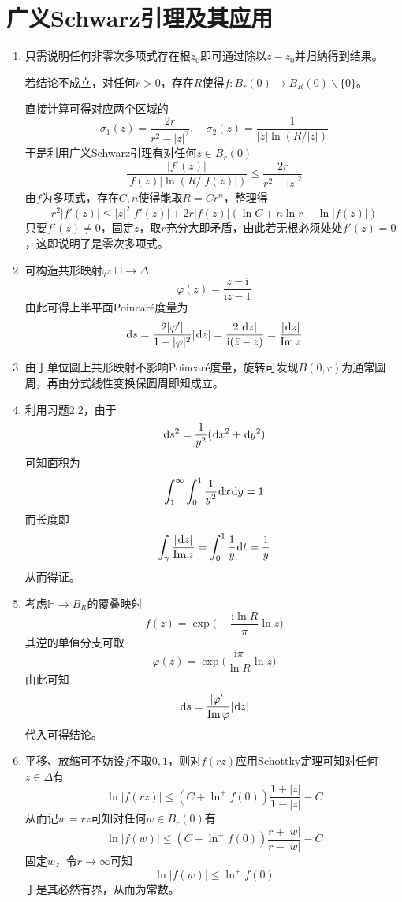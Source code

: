 \documentclass[a4paper,UTF8,fontset=windows,10pt]{ctexart}
\newcommand*{\ir}{\mathrm{i}}
\newcommand*{\dr}{\hspace{0.07em}\mathrm{d}}
\newcommand*{\im}{\mathrm{Im}\,}
\begin{document}
\section{广义Schwarz引理及其应用}
\begin{enumerate}
    \item 只需说明任何非零次多项式存在根$z_0$即可通过除以$z-z_0$并归纳得到结果。
    
    若结论不成立，对任何$r>0$，存在$R$使得$f:B_r(0)\to B_R(0)\backslash\{0\}$。

    直接计算可得对应两个区域的
    $$\sigma_1(z)=\frac{2r}{r^2-|z|^2},\quad\sigma_2(z)=\frac{1}{|z|\ln(R/|z|)}$$
    于是利用广义Schwarz引理有对任何$z\in B_r(0)$
    $$\frac{|f'(z)|}{|f(z)|\ln(R/|f(z)|)}\le\frac{2r}{r^2-|z|^2}$$
    由$f$为多项式，存在$C,n$使得能取$R=Cr^n$，整理得
    $$r^2|f'(z)|\le|z|^2|f'(z)|+2r|f(z)|(\ln C+n\ln r-\ln|f(z)|)$$
    只要$f'(z)\ne0$，固定$z$，取$r$充分大即矛盾，由此若无根必须处处$f'(z)=0$，这即说明了是零次多项式。
    
    \item 可构造共形映射$\varphi:\mathbb{H}\to\Delta$
    $$\varphi(z)=\frac{z-\ir}{\mathrm{i}z-1}$$
    由此可得上半平面Poincar\'e度量为
    $$\dr s=\frac{2|\varphi'|}{1-|\varphi|^2}|\dr z|=\frac{2|\dr z|}{\ir(\bar{z}-z)}=\frac{|\dr z|}{\im z}$$

    \item 由于单位圆上共形映射不影响Poincar\'e度量，旋转可发现$B(0,r)$为通常圆周，再由分式线性变换保圆周即知成立。
    
    \item 利用习题2.2，由于
    $$\dr s^2=\frac{1}{y^2}(\dr x^2+\dr y^2)$$
    可知面积为
    $$\int_1^\infty\int_0^1\frac{1}{y^2}\dr x\dr y=1$$
    而长度即
    $$\int_\gamma\frac{|\dr z|}{\im z}=\int_0^1\frac{1}{y}\dr t=\frac{1}{y}$$
    从而得证。

    \item 考虑$\mathbb{H}\to B_R$的覆叠映射
    $$f(z)=\exp\bigg(-\frac{\ir\ln R}{\pi}\ln z\bigg)$$
    其逆的单值分支可取
    $$\varphi(z)=\exp\bigg(\frac{\ir\pi}{\ln R}\ln z\bigg)$$
    由此可知
    $$\dr s=\frac{|\varphi'|}{\im\varphi}|\dr z|$$
    代入可得结论。
    
    \item 平移、放缩可不妨设$f$不取$0,1$，则对$f(rz)$应用Schottky定理可知对任何$z\in \Delta$有
    $$\ln|f(rz)|\le(C+\ln^+f(0))\frac{1+|z|}{1-|z|}-C$$
    从而记$w=rz$可知对任何$w\in B_r(0)$有
    $$\ln|f(w)|\le(C+\ln^+f(0))\frac{r+|w|}{r-|w|}-C$$
    固定$w$，令$r\to\infty$可知
    $$\ln|f(w)|\le \ln^+f(0)$$
    于是其必然有界，从而为常数。


\end{enumerate}
\end{document}
